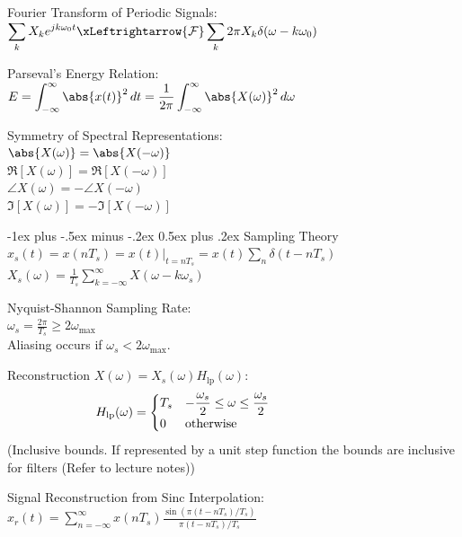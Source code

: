 \documentclass[12pt,landscape,letterpaper]{article}
\makeatletter
\renewcommand{\section}{\@startsection{section}{1}{0mm}%
                                {-1ex plus -.5ex minus -.2ex}%
                                {0.5ex plus .2ex}%
                                {\normalfont\normalsize\bfseries}}
\newcommand{\tab}{\hspace{0.02\textwidth}}
\newcommand{\ds}{\displaystyle}
\makeatother
\begin{document}
\begin{multicols*}{3}
Fourier Transform of Periodic Signals:\\
\tab $\ds \sum_k X_k e^{jk\omega_0 t} \xLeftrightarrow{\mathcal{F}} \sum_k 2\pi X_k \delta(\omega - k\omega_0)$

Parseval's Energy Relation:\\
\tab $\ds E = \int_{-\infty}^{\infty} \abs{x(t)}^2\,dt = \frac{1}{2\pi}\int_{-\infty}^{\infty}\abs{X(\omega)}^2\,d\omega$

Symmetry of Spectral Representations:\\
\tab $\abs{X(\omega)} = \abs{X(-\omega)}$\\
\tab $\Re[X(\omega)] = \Re[X(-\omega)]$\\
\tab $\angle X(\omega) = -\angle X(-\omega)$\\
\tab $\Im[X(\omega)] = -\Im[X(-\omega)]$

\section{Sampling Theory}
\tab $x_s(t) = x(nT_s) = x(t)\rvert_{t = nT_s} = x(t)\sum_n \delta(t - nT_s)$\\
\tab $\ds X_s(\omega) = \frac{1}{T_s} \sum_{k=-\infty}^{\infty}X(\omega - k\omega_s)$

Nyquist-Shannon Sampling Rate:\\
\tab $\omega_s = \frac{2\pi}{T_s} \geq 2\omega_\text{max}$\\
\tab Aliasing occurs if $\omega_s < 2\omega_\text{max}$.

Reconstruction $X(\omega)=X_s(\omega)H_\text{lp}(\omega)$:
\vspace{-1em}
\begin{equation*}
\hspace{-8em}
H_{\text{lp}}(\omega) =
\begin{cases}
T_s & \ds -\frac{\omega_s}{2} \leq \omega \leq \frac{\omega_s}{2}\\
0 & \text{otherwise}
\end{cases}
\end{equation*}
\tab (Inclusive bounds. If represented by a unit step function the bounds are inclusive for filters (Refer to lecture notes))

Signal Reconstruction from Sinc Interpolation:\\
\tab $\ds x_r(t) = \sum_{n=-\infty}^{\infty} x(nT_s) \frac{\sin(\pi(t-nT_s)/T_s)}{\pi(t-nT_s)/T_s}$
\end{multicols*}

\newpage
\end{document}
